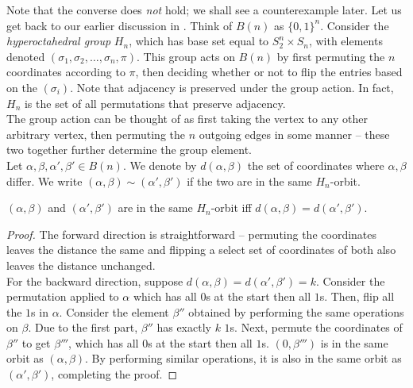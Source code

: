 	Note that the converse does \emph{not} hold; we shall see a counterexample later. Let us get back to our earlier discussion in . Think of $B(n)$ as $\{0,1\}^n$. Consider the \emph{hyperoctahedral group} $H_n$, which has base set equal to $S_2^n \times S_n$, with elements denoted $(\sigma_1,\sigma_2,\ldots,\sigma_n,\pi)$. This group acts on $B(n)$ by first permuting the $n$ coordinates according to $\pi$, then deciding whether or not to flip the entries based on the $(\sigma_i)$. Note that adjacency is preserved under the group action. In fact, $H_n$ is the set of all permutations that preserve adjacency.\\
	The group action can be thought of as first taking the vertex to any other arbitrary vertex, then permuting the $n$ outgoing edges in some manner -- these two together further determine the group element.\\

	Let $\alpha,\beta,\alpha',\beta' \in B(n)$. We denote by $d(\alpha,\beta)$ the set of coordinates where $\alpha,\beta$ differ. We write $(\alpha,\beta) \sim (\alpha',\beta')$ if the two are in the same $H_n$-orbit.

	\begin{flem}
		$(\alpha,\beta)$ and $(\alpha',\beta')$ are in the same $H_n$-orbit iff $d(\alpha,\beta) = d(\alpha',\beta')$.
	\end{flem}
	\begin{proof}
		The forward direction is straightforward -- permuting the coordinates leaves the distance the same and flipping a select set of coordinates of both also leaves the distance unchanged.\\
		For the backward direction, suppose $d(\alpha,\beta) = d(\alpha',\beta') = k$. Consider the permutation applied to $\alpha$ which has all $0$s at the start then all $1$s. Then, flip all the $1$s in $\alpha$. Consider the element $\beta''$ obtained by performing the same operations on $\beta$. Due to the first part, $\beta''$ has exactly $k$ $1$s. Next, permute the coordinates of $\beta''$ to get $\beta'''$, which has all $0$s at the start then all $1$s. $(0,\beta''')$ is in the same orbit as $(\alpha,\beta)$. By performing similar operations, it is also in the same orbit as $(\alpha',\beta')$, completing the proof. 
	\end{proof}

